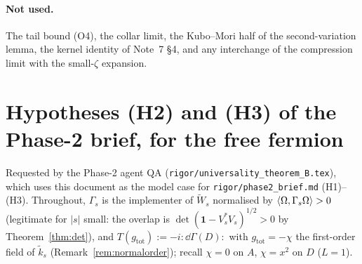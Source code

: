 \documentclass[11pt]{article}
\newcommand{\Wt}{\widetilde W}\newcommand{\kt}{\widetilde k}
\newcommand{\Gm}{\Gamma}
\newcommand{\ip}[2]{\left\langle #1,#2\right\rangle}\newcommand{\one}{\mathbf 1}
\begin{document}
\paragraph{Not used.}
The tail bound (O4), the collar limit, the Kubo--Mori half of the second-variation lemma, the
kernel identity of Note~7 \S4, and any interchange of the compression limit with the small-$\zeta$
expansion.


\section{Hypotheses (H2) and (H3) of the Phase-2 brief, for the free fermion}\label{sec:H2H3}
Requested by the Phase-2 agent QA (\texttt{rigor/universality\_theorem\_B.tex}), which uses this
document as the model case for \texttt{rigor/phase2\_brief.md} (H1)--(H3).  Throughout, $\Gm_s$ is the
implementer of $\Wt_s$ normalised by $\ip\Om{\Gm_s\Om}>0$ (legitimate for $|s|$ small: the overlap is
$\det(\one-V_s^*V_s)^{1/2}>0$ by Theorem~\ref{thm:det}), and
$T(g_{\mathrm{tot}}):=-i\!:\!\dd\Gm(D)\!:$ with $g_{\mathrm{tot}}=-\chi$ the first-order field of
$\kt_s$ (Remark~\ref{rem:normalorder}); recall $\chi=0$ on $A$, $\chi=x^2$ on $D$ ($L=1$).
\end{document}
